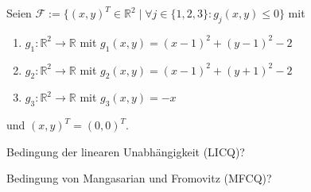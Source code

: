 
Seien $\mathcal F:=\{(x,y)^T\in\mathbb R^2\mid \forall j\in\{1,2,3\}:g_j(x,y)\leq 0\}$ mit 
\begin{enumerate}
\item $g_1: \mathbb R^2\to\mathbb R$ mit $g_1(x,y)=(x-1)^2+(y-1)^2-2$
\item $g_2: \mathbb R^2\to\mathbb R$ mit $g_2(x,y)=(x-1)^2+(y+1)^2-2$
\item $g_3: \mathbb R^2\to\mathbb R$ mit $g_3(x,y)=-x$
\end{enumerate}
und $(x,y)^T=(0,0)^T$.
\begin{compactenum}[(i)]
\item Bedingung der linearen Unabhängigkeit (LICQ)?
\item Bedingung von Mangasarian und Fromovitz (MFCQ)?
\end{compactenum}
